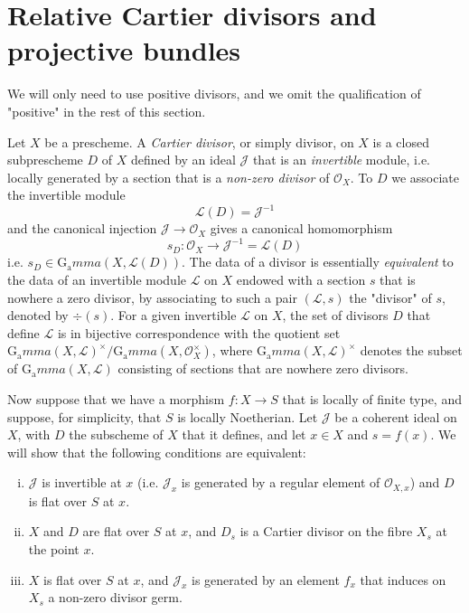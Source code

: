 \section{Relative Cartier divisors and projective bundles}\label{fga3.v-4}


We will only need to use positive divisors, and we omit the qualification of "positive" in the rest of this section.

Let $X$ be a prescheme.
A \emph{Cartier divisor}, or simply divisor, on $X$ is a closed subprescheme $D$ of $X$ defined by an ideal $\mathcal{J}$ that is an \emph{invertible} module, i.e. locally generated by a section that is a \emph{non-zero divisor} of $\mathcal{O}_X$.
To $D$ we associate the invertible module
\[
    \mathcal{L}(D) = \mathcal{J}^{-1}
\]
and the canonical injection $\mathcal{J}\to\mathcal{O}_X$ gives a canonical homomorphism
\[
    s_D\colon \mathcal{O}_X \to \mathcal{J}^{-1} = \mathcal{L}(D)
\]
i.e. $s_D\in\operatorname{G_a}mma(X,\mathcal{L}(D))$.
The data of a divisor is essentially \emph{equivalent} to the data of an invertible module $\mathcal{L}$ on $X$ endowed with a section $s$ that is nowhere a zero divisor, by associating to such a pair $(\mathcal{L},s)$ the "divisor" of $s$, denoted by $\div(s)$.
For a given invertible $\mathcal{L}$ on $X$, the set of divisors $D$ that define $\mathcal{L}$ is in bijective correspondence with the quotient set $\operatorname{G_a}mma(X,\mathcal{L})^{\times}/\operatorname{G_a}mma(X,\mathcal{O}_X^\times)$, where $\operatorname{G_a}mma(X,\mathcal{L})^\times$ denotes the subset of $\operatorname{G_a}mma(X,\mathcal{L})$ consisting of sections that are nowhere zero divisors.

Now suppose that we have a morphism $f\colon X\to S$ that is locally of finite type, and suppose, for simplicity, that $S$ is locally Noetherian.
Let $\mathcal{J}$ be a coherent ideal on $X$, with $D$ the subscheme of $X$ that it defines, and let $x\in X$ and $s=f(x)$.
We will show that the following conditions are equivalent:
\begin{enumerate}[i.]
    \item $\mathcal{J}$ is invertible at $x$ (i.e. $\mathcal{J}_x$ is generated by a regular element of $\mathcal{O}_{X,x}$) and $D$ is flat over $S$ at $x$.
    \item  $X$ and $D$ are flat over $S$ at $x$, and $D_s$ is a Cartier divisor on the fibre $X_s$ at the point $x$.
    \item $X$ is flat over $S$ at $x$, and $\mathcal{J}_x$ is generated by an element $f_x$ that induces on $X_s$ a non-zero divisor germ.
\end{enumerate}

